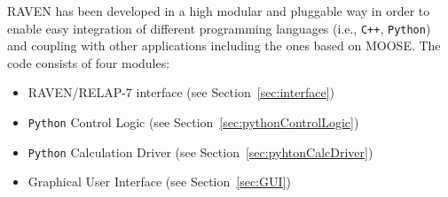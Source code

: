 \documentclass{mc2013}
\begin{document}

RAVEN has been developed in a high modular and pluggable way in order to enable easy integration of different programming languages (i.e., \verb!C++!, \verb!Python!) and coupling with other applications including the ones based on MOOSE. The code consists of four modules:
\begin{itemize}
\item RAVEN/RELAP-7 interface (see Section~\ref{sec:interface})
\item \verb!Python! Control Logic (see Section~\ref{sec:pythonControlLogic})
\item \verb!Python! Calculation Driver (see Section~\ref{sec:pyhtonCalcDriver})
\item Graphical User Interface (see Section~\ref{sec:GUI})
\end{itemize}
\end{document}
